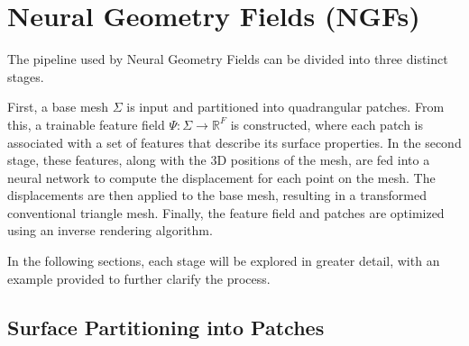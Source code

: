 \section{Neural Geometry Fields (NGFs)}\label{Sec:MainPart}

The pipeline used by Neural Geometry Fields can be divided into three distinct stages. 

First, a base mesh $\Sigma$ is input and partitioned into quadrangular patches. 
From this, a trainable feature field $\Psi : \Sigma \rightarrow \mathbb{R}^F$ is constructed, where each patch is associated with a set of features that describe its surface properties. 
In the second stage, these features, along with the 3D positions of the mesh, are fed into a neural network to compute the displacement for each point on the mesh. 
The displacements are then applied to the base mesh, resulting in a transformed conventional triangle mesh. 
Finally, the feature field and patches are optimized using an inverse rendering algorithm. 

In the following sections, each stage will be explored in greater detail, with an example provided to further clarify the process. 





\subsection{Surface Partitioning into Patches}

